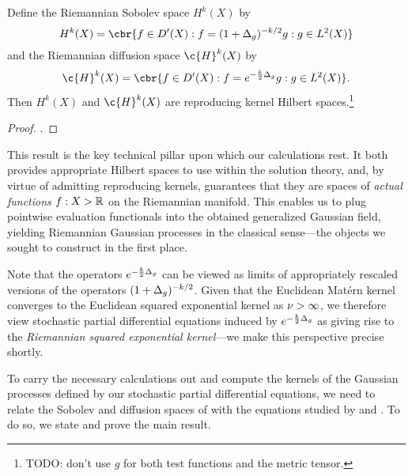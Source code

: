\documentclass[11pt]{book}
\begin{document}
\begin{result}
Define the Riemannian Sobolev space $H^k(X)$ by
\[
H^k(X) = \cbr{f \in D'(X) : f = (1 + \lap_g)^{-k/2} g : g \in L^2(X)}
\]
and the Riemannian diffusion space $\c{H}^k(X)$ by
\[
\c{H}^k(X) = \cbr{f \in D'(X) : f = e^{-\frac{k}{2}\lap_g} g : g \in L^2(X)}
.
\]
Then $H^k(X)$ and $\c{H}^k(X)$ are reproducing kernel Hilbert spaces.\footnote{TODO: don't use $g$ for both test functions and the metric tensor.}
\end{result}

\begin{proof}
\textcite[Theorem 3 and Theorem 6]{devito20}.
\end{proof}

This result is the key technical pillar upon which our calculations rest.
It both provides appropriate Hilbert spaces to use within the solution theory, and, by virtue of admitting reproducing kernels, guarantees that they are spaces of \emph{actual functions} $f : X \-> \mathbb{R}$ on the Riemannian manifold.
This enables us to plug pointwise evaluation functionals into the obtained generalized Gaussian field, yielding Riemannian Gaussian processes in the classical sense---the objects we sought to construct in the first place.

Note that the operators $e^{-\frac{k}{2}\Delta_g}$ can be viewed as limits of appropriately rescaled versions of the operators $(1 + \Delta_g)^{-k/2}$. 
Given that the Euclidean Matérn kernel converges to the Euclidean squared exponential kernel as $\nu\->\infty$, we therefore view stochastic partial differential equations induced by $e^{-\frac{k}{2}\Delta_g}$ as giving rise to the \emph{Riemannian squared exponential kernel}---we make this perspective precise shortly.

To carry the necessary calculations out and compute the kernels of the Gaussian processes defined by our stochastic partial differential equations, we need to relate the Sobolev and diffusion spaces of \textcite{devito20} with the equations studied by \textcite{whittle63} and \textcite{lindgren11}.
To do so, we state and prove the main result.
\end{document}
